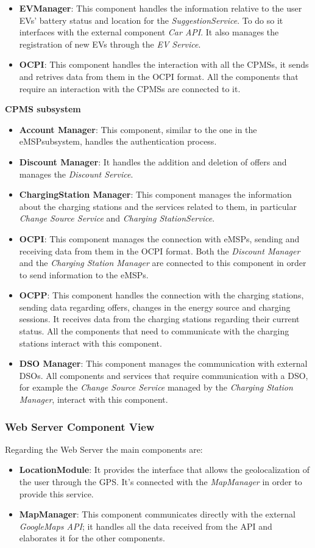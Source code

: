 \documentclass[table, 12pt]{article}
\begin{document}
\begin{itemize}
    \item \textbf{EVManager}: This component handles the information relative to the user EVs' battery status and location for the \textit{SuggestionService}. To do so it interfaces with the external component \textit{Car API}. It also manages the registration of new EVs through the \textit{EV Service}.
    \item \textbf{OCPI}: This component handles the interaction with all the CPMSs, it sends and retrives data from them in the OCPI format. All the components that require an interaction with the CPMSs are connected to it.
\end{itemize}
\textbf{CPMS subsystem}
\begin{itemize}
    \item \textbf{Account Manager}: This component, similar to the one in the eMSPsubsystem, handles the authentication process. 
    \item \textbf{Discount Manager}: It handles the addition and deletion of offers and manages the \textit{Discount Service}.
    \item \textbf{ChargingStation Manager}: This component manages the information about the charging stations and the services related to them, in particular \textit{Change Source Service} and \textit{Charging StationService}.
    \item \textbf{OCPI}: This component manages the connection with eMSPs, sending and receiving data from them in the OCPI format. Both the \textit{Discount Manager} and the \textit{Charging Station Manager} are connected to this component in order to send information to the eMSPs.
    \item \textbf{OCPP}: This component handles the connection with the charging stations, sending data regarding offers, changes in the energy source and charging sessions. It receives data from the charging stations regarding their current status. All the components that need to communicate with the charging stations interact with this component.
    \item \textbf{DSO Manager}: This component manages the communication with external DSOs. All components and services that require communication with a DSO, for example the \textit{Change Source Service} managed by the \textit{Charging Station Manager}, interact with this component.
\end{itemize}
\subsubsection*{Web Server Component View}
Regarding the Web Server the main components are:
\begin{itemize}
    \item \textbf{LocationModule}: It provides the interface that allows the geolocalization of the user through the GPS. It's connected with the \textit{MapManager} in order to provide this service.
    \item \textbf{MapManager}: This component communicates directly with the external \textit{GoogleMaps API}; it handles all the data received from the API and elaborates it for the other components.
\end{itemize}
\end{document}

